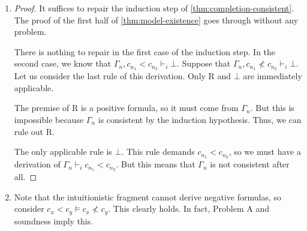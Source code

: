 \documentclass[a4paper]{article}
\begin{document}
\begin{enumerate}
  \begin{theorem}[Completeness]
    If $\Gamma \vDash \varphi$ then $\Gamma \vdash \varphi$.
  \end{theorem}
  \begin{proof}
    Suppose that $\Gamma \nvdash \varphi$ and that $\Gamma \vDash \varphi$.
    The first assumption implies that $\Gamma$ is consistent, so by \cref{thm:model-existence}, $\Gamma$ has a model $(X,R)$ which also satisfies $\lnot\varphi$.
    But this is a contradiction because $(X,R)$ must satisfy its opposite $\varphi$ by the second assumption.
  \end{proof}
\item
  \begin{proof}
    It suffices to repair the induction step of \cref{thm:completion-consistent}.
    The proof of the first half of \cref{thm:model-existence} goes through without any problem.

    There is nothing to repair in the first case of the induction step.
    In the second case, we know that $\Gamma_{n},c_{n_1} < c_{n_2} \vdash_i \bot$.
    Suppose that $\Gamma_{n},c_{n_1} \nless c_{n_2} \vdash_i \bot$.
    Let us consider the last rule of this derivation.
    Only R and $\bot$ are immediately applicable.

    The premise of R is a positive formula, so it must come from $\Gamma_{n}$.
    But this is impossible because $\Gamma_{n}$ is consistent by the induction hypothesis.
    Thus, we can rule out R.

    The only applicable rule is $\bot$.
    This rule demands $c_{n_1} < c_{n_2}$, so we must have a derivation of $\Gamma_{n} \vdash_{i} c_{n_1} < c_{n_2}$.
    But this means that $\Gamma_{n}$ is not consistent after all.
  \end{proof}
\item Note that the intuitionistic fragment cannot derive negative formulas, so consider $c_{x} < c_{y} \vDash c_{x} \nless c_{y}$.
  This clearly holds.
  In fact, Problem A and soundness imply this.
\end{enumerate}

\end{document}
